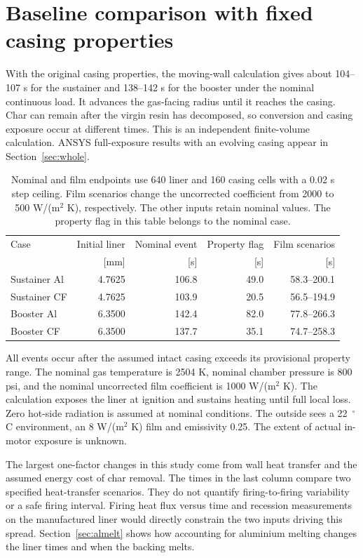 \section{Baseline comparison with fixed casing properties}
With the original casing properties, the moving-wall calculation gives about 104--107 s for the sustainer and
138--142 s for the booster under the nominal continuous load. It advances the
gas-facing radius until it reaches the casing. Char can remain after the
virgin resin has decomposed, so conversion and casing exposure occur at
different times. This is an independent finite-volume calculation. ANSYS
full-exposure results with an evolving casing appear in Section~\ref{sec:whole}.
\begin{table}[H]\centering
\begin{tabular}{lrrrr}\toprule
Case & Initial liner & Nominal event & Property flag & Film scenarios\\
 & [mm] & [s] & [s] & [s]\\\midrule
Sustainer Al & 4.7625 & 106.8 & 49.0 & 58.3--200.1 \\
Sustainer CF & 4.7625 & 103.9 & 20.5 & 56.5--194.9 \\
Booster Al & 6.3500 & 142.4 & 82.0 & 77.8--266.3 \\
Booster CF & 6.3500 & 137.7 & 35.1 & 74.7--258.3 \\
\bottomrule\end{tabular}
\caption{Nominal and film endpoints use 640 liner and 160 casing cells with
a 0.02 s step ceiling. Film scenarios change the uncorrected coefficient from
2000 to 500 W/(m$^2$ K), respectively. The other inputs retain nominal values.
The property flag in this table belongs to the nominal case.}
\end{table}
All events occur after the assumed intact casing exceeds its provisional
property range. The nominal gas temperature is 2504 K, nominal chamber pressure
is 800 psi, and the nominal uncorrected film coefficient is 1000 W/(m$^2$ K).
The calculation exposes the liner at ignition and sustains heating until full
local loss. Zero hot-side radiation is assumed at nominal conditions. The
outside sees a 22~$^\circ$C environment, an 8 W/(m$^2$ K) film and emissivity 0.25.
The extent of actual in-motor exposure is unknown.

The largest one-factor changes in this study come from wall heat transfer and
the assumed energy cost of char removal. The times in the last column compare
two specified heat-transfer scenarios. They do not quantify firing-to-firing
variability or a safe firing interval. Firing heat flux versus time and
recession measurements on the manufactured liner would directly constrain
the two inputs driving this spread. Section~\ref{sec:almelt} shows how accounting
for aluminium melting changes the liner times and when the backing melts.

